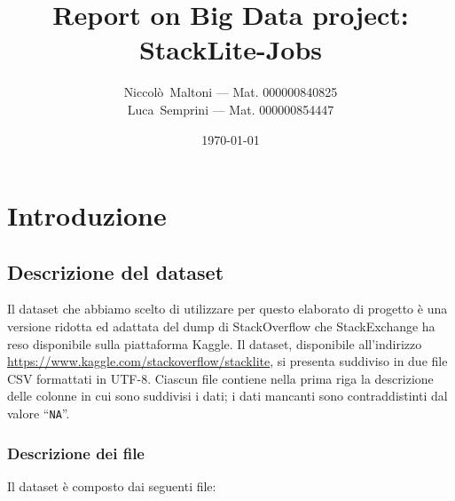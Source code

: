 \documentclass[
  a4paper,            %
  10pt                %
]{article}
\title{\textbf{Report on Big Data project: \\StackLite-Jobs}}
\author{
  Niccolò~Maltoni --- Mat. 000000840825\\%
  Luca~Semprini --- Mat. 000000854447
}
\date{\today}
\begin{document}
  \maketitle
  \newpage

  \tableofcontents

  \newpage

  \section{Introduzione}\label{sec:intro}
  \subsection{Descrizione del dataset}\label{subsec:dataset}

  Il dataset che abbiamo scelto di utilizzare per questo elaborato di progetto è una versione ridotta ed adattata del dump di StackOverflow che StackExchange ha reso disponibile sulla piattaforma Kaggle.
  Il dataset, disponibile all'indirizzo \url{https://www.kaggle.com/stackoverflow/stacklite}, si presenta suddiviso in due file CSV formattati in UTF-8.
  Ciascun file contiene nella prima riga la descrizione delle colonne in cui sono suddivisi i dati;
  i dati mancanti sono contraddistinti dal valore ``\texttt{NA}''.

  \subsubsection{Descrizione dei file}\label{subsub:dataset:files}

  Il dataset è composto dai seguenti file:
\end{document}
